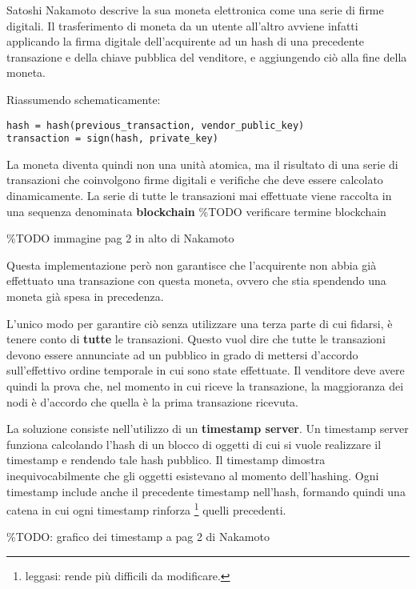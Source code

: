 Satoshi Nakamoto descrive la sua moneta elettronica come una serie di
firme digitali. Il trasferimento di moneta da un utente all'altro
avviene infatti applicando la firma digitale dell'acquirente ad un hash
di una precedente transazione e della chiave pubblica del venditore, e
aggiungendo ciò alla fine della moneta.

Riassumendo schematicamente:

\begin{verbatim}
hash = hash(previous_transaction, vendor_public_key)
transaction = sign(hash, private_key)
\end{verbatim}

La moneta diventa quindi non una unità atomica, ma il risultato di una
serie di transazioni che coinvolgono firme digitali e verifiche che deve
essere calcolato dinamicamente. La serie di tutte le transazioni mai
effettuate viene raccolta in una sequenza denominata \textbf{blockchain}
\%TODO verificare termine blockchain

\%TODO immagine pag 2 in alto di Nakamoto

Questa implementazione però non garantisce che l'acquirente non abbia
già effettuato una transazione con questa moneta, ovvero che stia
spendendo una moneta già spesa in precedenza.

L'unico modo per garantire ciò senza utilizzare una terza parte di cui
fidarsi, è tenere conto di \textbf{tutte} le transazioni. Questo vuol
dire che tutte le transazioni devono essere annunciate ad un pubblico in
grado di mettersi d'accordo sull'effettivo ordine temporale in cui sono
state effettuate. Il venditore deve avere quindi la prova che, nel
momento in cui riceve la transazione, la maggioranza dei nodi è
d'accordo che quella è la prima transazione ricevuta.

La soluzione consiste nell'utilizzo di un \textbf{timestamp server}. Un
timestamp server funziona calcolando l'hash di un blocco di oggetti di
cui si vuole realizzare il timestamp e rendendo tale hash pubblico. Il
timestamp dimostra inequivocabilmente che gli oggetti esistevano al
momento dell'hashing. Ogni timestamp include anche il precedente
timestamp nell'hash, formando quindi una catena in cui ogni timestamp
rinforza \footnote{leggasi: rende più difficili da modificare.} quelli
precedenti.

\%TODO: grafico dei timestamp a pag 2 di Nakamoto

